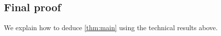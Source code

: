 \documentclass[reqno]{amsart}
\numberwithin{equation}{section}
\numberwithin{equation}{section}
\numberwithin{equation}{section}
\theoremstyle{definition}
\theoremstyle{remark}
\theoremstyle{remark}
\begin{document}




\subsection{Final proof}
We explain how to deduce \cref{thm:main} using the technical results above.



\end{document}

